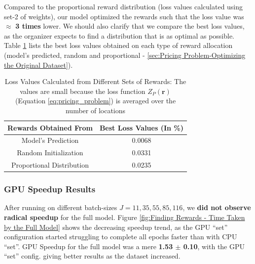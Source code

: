 \documentclass[12pt]{article}
\newcommand{\vect}[1]{\mathbf{#1}}  %
\begin{document}
    Compared to the proportional reward distribution (loss values calculated using set-2 of weights), our model optimized the rewards such that the loss value was $\approx$ \textbf{3 times} lower. We should also clarify that we compare the best loss values, as the organizer expects to find a distribution that is as optimal as possible. Table \ref{tab:Loss Values Calculated from Different Sets of Rewards} lists the best loss values obtained on each type of reward allocation (model's predicted, random and proportional - \cref{sec:Pricing Problem-Optimizing the Original Dataset}).
    \begin{table}[!htbp]
        \centering
        \caption[Loss Values Calculated from Different Sets of Rewards]{Loss Values Calculated from Different Sets of Rewards: The values are small because the loss function $Z_P(\vect{r})$ (Equation \ref{eq:pricing_problem}) is averaged over the number of locations}
        \label{tab:Loss Values Calculated from Different Sets of Rewards}
        \begin{tabular}{|c|c|}
            \hline
            \textbf{Rewards Obtained From} & \textbf{Best Loss Values (In \%)}\\
            \hline
            Model's Prediction & 0.0068\\
            Random Initialization & 0.0331\\
            Proportional Distribution & 0.0235\\
            \hline
        \end{tabular}
    \end{table}
    
    \subsubsection{GPU Speedup Results} \label{sec:PriProbRes - GPU}
    After running on different batch-sizes $J = 11, 35, 55, 85, 116$, we \textbf{did not observe radical speedup} for the full model. Figure \ref{fig:Finding Rewards - Time Taken by the Full Model} shows the decreasing speedup trend, as the GPU ``set'' configuration started struggling to complete all epochs faster than with CPU ``set''. GPU Speedup for the full model was a mere \textbf{1.53 $\pm$ 0.10}, with the GPU ``set'' config. giving better results as the dataset increased. 
    
\end{document}
